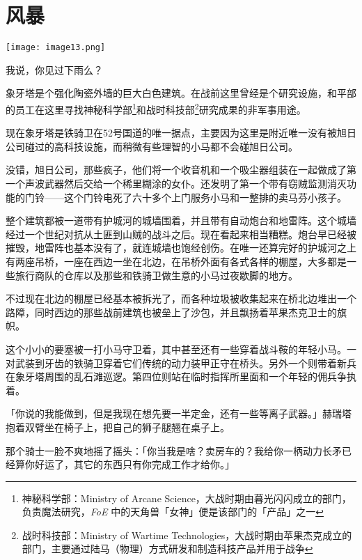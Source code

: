 \chapter{风暴}

\texttt{[image: image13.png]}

\begin{intro}
我说，你见过下雨么？
\end{intro}


象牙塔是个强化陶瓷外墙的巨大白色建筑。在战前这里曾经是个研究设施，和平部的员工在这里寻找神秘科学部\footnote{神秘科学部：Ministry of Arcane Science，大战时期由暮光闪闪成立的部门，负责魔法研究，\emph{FoE} 中的天角兽「女神」便是该部门的「产品」之一}和战时科技部\footnote{战时科技部：Ministry of Wartime Technologies，大战时期由苹果杰克成立的部门，主要通过陆马（物理）方式研发和制造科技产品并用于战争}研究成果的非军事用途。

现在象牙塔是铁骑卫在52号国道的唯一据点，主要因为这里是附近唯一没有被旭日公司碰过的高科技设施，而稍微有些理智的小马都不会碰旭日公司。

没错，旭日公司，那些疯子，他们将一个收音机和一个吸尘器组装在一起做成了第一个声波武器然后交给一个稀里糊涂的女仆。还发明了第一个带有窃贼监测消灭功能的门铃——这个门铃电死了六十多个上门服务小马和一整排的卖马芬小孩子。

整个建筑都被一道带有护城河的城墙围着，并且带有自动炮台和地雷阵。这个城墙经过一个世纪对抗从土匪到山贼的战斗之后。现在看起来相当糟糕。炮台早已经被摧毁，地雷阵也基本没有了，就连城墙也饱经创伤。在唯一还算完好的护城河之上有两座吊桥，一座在西边一坐在北边，在吊桥外面有各式各样的棚屋，大多都是一些旅行商队的仓库以及那些和铁骑卫做生意的小马过夜歇脚的地方。

不过现在北边的棚屋已经基本被拆光了，而各种垃圾被收集起来在桥北边堆出一个路障，同时西边的那些战前建筑也被垒上了沙包，并且飘扬着苹果杰克卫士的旗帜。

这个小小的要塞被一打小马守卫着，其中甚至还有一些穿着战斗鞍的年轻小马。一对武装到牙齿的铁骑卫穿着它们传统的动力装甲正守在桥头。另外一个则带着新兵在象牙塔周围的乱石滩巡逻。第四位则站在临时指挥所里面和一个年轻的佣兵争执着。

「你说的我能做到，但是我现在想先要一半定金，还有一些等离子武器。」赫瑞塔抱着双臂坐在椅子上，把自己的狮子腿翘在桌子上。

那个骑士一脸不爽地摇了摇头：「你当我是啥？卖房车的？我给你一柄动力长矛已经算你好运了，其它的东西只有你完成工作才给你。」

